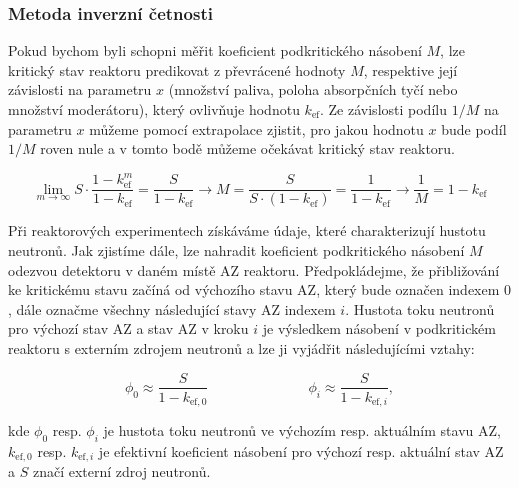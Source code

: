 
\subsubsection{Metoda inverzní četnosti}

Pokud bychom byli schopni měřit koeficient podkritického násobení $M$, lze kritický stav reaktoru predikovat z převrácené hodnoty $M$, respektive její závislosti na parametru $x$ (množství paliva, poloha absorpčních tyčí nebo množství moderátoru), který ovlivňuje hodnotu $k_\text{ef}$. Ze závislosti podílu $1/M$ na parametru $x$ můžeme pomocí extrapolace zjistit, pro jakou hodnotu $x$ bude podíl $1/M$ roven nule a v tomto bodě můžeme očekávat kritický stav reaktoru.

\begin{equation*}
    \lim_{m \to \infty} S \cdot \frac{1 - k_\text{ef}^m}{1 - k_\text{ef}} = \frac{S}{1 - k_\text{ef}} \rightarrow M = \frac{S}{S \cdot (1 - k_\text{ef})} = \frac{1}{1 - k_\text{ef}} \rightarrow \frac{1}{M} = 1 - k_\text{ef}
\end{equation*}

Při reaktorových experimentech získáváme údaje, které charakterizují hustotu neutronů. Jak zjistíme dále, lze nahradit koeficient podkritického násobení $M$ odezvou detektoru v daném místě AZ reaktoru. Předpokládejme, že přibližování ke kritickému stavu začíná od výchozího stavu AZ, který bude označen indexem $0$, dále označme všechny následující stavy AZ indexem $i$. Hustota toku neutronů pro výchozí stav AZ a stav AZ v kroku $i$ je výsledkem násobení v podkritickém reaktoru s externím zdrojem neutronů a lze ji vyjádřit následujícími vztahy:

\begin{equation*}
    \phi_0 \approx \frac{S}{1-k_{\text{ef},0}} \hspace{3cm}\phi_i \approx \frac{S}{1-k_{\text{ef},i}},
\end{equation*}

kde $\phi_0$ resp. $\phi_i$ je hustota toku neutronů ve výchozím resp. aktuálním stavu AZ, $k_{\text{ef},0}$ resp. $k_{\text{ef},i}$ je efektivní koeficient násobení pro výchozí resp. aktuální stav AZ a $S$ značí externí zdroj neutronů.

